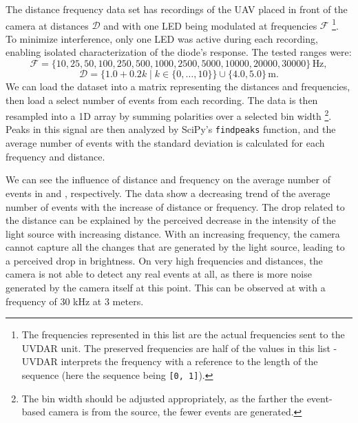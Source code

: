 The distance frequency data set has recordings of the \ac{UAV} placed in front of the camera at distances $\mathcal{D}$ and with one \ac{LED} being modulated
at frequencies $\mathcal{F}$ \footnote{The frequencies represented in this list are the actual frequencies sent to the UVDAR unit. The preserved frequencies
are half of the values in this list - UVDAR interprets the frequency with a reference to the length of the sequence (here the sequence being \texttt{[0, 1]}).}. To minimize interference, only one LED was active during each recording, enabling isolated characterization of the diode’s response. The tested ranges were:
\[
\mathcal{F} = \{10, 25, 50, 100, 250, 500, 1000, 2500, 5000, 10000, 20000, 30000\} \, \text{Hz},
\]
\[
\mathcal{D} = \{1.0 + 0.2k \mid k \in \{0, \dots, 10\}\} \cup \{4.0, 5.0\} \, \text{m}.
\]
We can load the dataset into a matrix representing the distances and frequencies, then load a select number of events from each recording.
The data is then resampled into a 1D array by summing polarities over a selected bin width
\footnote{The bin width should be adjusted appropriately, as the farther the event-based camera is from the source, the fewer events are generated.}.
Peaks in this signal are then analyzed by SciPy's \texttt{findpeaks} function,
and the average number of events with the standard deviation is calculated for each frequency and distance.

We can see the influence of distance and frequency on the average number of events in  and , respectively. The data show a decreasing trend of the average number of events
with the increase of distance or frequency. The drop related to the distance can be explained by the perceived decrease in the intensity of the light source with increasing distance. With an increasing frequency, the camera cannot capture
all the changes that are generated by the light source, leading to a perceived drop in brightness.
On very high frequencies and distances, the camera is not able
to detect any real events at all, as there is more noise generated by the camera itself at this point. This can be observed
at  with a frequency of $30$ kHz at $3$ meters.

